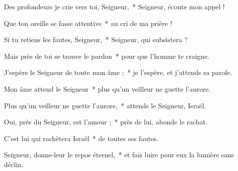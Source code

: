 \item Des profondeurs je crie vers toi, Seigneur,~* Seigneur, écoute mon appel !

\item Que ton oreille se fasse attentive~* au cri de ma prière !

\item Si tu retiens les fautes, Seigneur,~* Seigneur, qui subsistera ?

\item Mais près de toi se trouve le pardon~* pour que l'homme te craigne.

\item J'espère le Seigneur de toute mon âme ;~* je l'espère, et j'attends sa parole.

\item Mon âme attend le Seigneur~* plus qu'un veilleur ne guette l'aurore.

\item Plus qu'un veilleur ne guette l'aurore,~* attends le Seigneur, Israël.

\item Oui, près du Seigneur, est l'amour ;~* près de lui, abonde le rachat.

\item C'est lui qui rachètera Israël~* de toutes ses fautes.

\item Seigneur, donne-leur le repos éternel,~* et fais luire pour eux la lumière sans déclin.